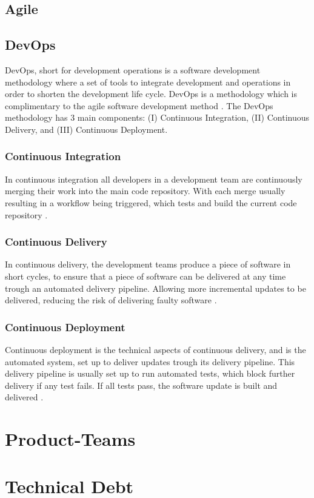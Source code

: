 \subsection{Agile}


\subsection{DevOps}
DevOps, short for development operations is a software development methodology where a set of tools to integrate development and operations in order to shorten the development life cycle. DevOps is a methodology which is complimentary to the agile software development method \cite{devops_wiki_2023}. The DevOps methodology has 3 main components: (I) Continuous Integration, (II) Continuous Delivery, and (III) Continuous Deployment.

\subsubsection{Continuous Integration}
In continuous integration all developers in a development team are continuously merging their work into the main code repository. With each merge usually resulting in a workflow being triggered, which tests and build the current code repository \cite{continuous_integration_wiki_2023}.

\subsubsection{Continuous Delivery}
In continuous delivery, the development teams produce a piece of software in short cycles, to ensure that a piece of software can be delivered at any time trough an automated delivery pipeline. Allowing more incremental updates to be delivered, reducing the risk of delivering faulty software \cite{continuous_delivery_wiki_2023}.

\subsubsection{Continuous Deployment}
Continuous deployment is the technical aspects of continuous delivery, and is the automated system, set up to deliver updates trough its delivery pipeline. This delivery pipeline is usually set up to run automated tests, which block further delivery if any test fails. If all tests pass, the software update is built and delivered \cite{continuous_deployment_wiki_2023}.

\section{Product-Teams}

\section{Technical Debt}
